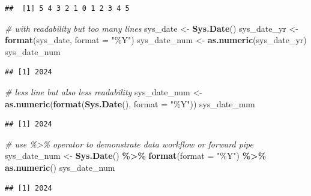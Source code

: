 \documentclass[
]{book}
\newenvironment{Shaded}{\begin{snugshade}}{\end{snugshade}}
\newcommand{\AttributeTok}[1]{\textcolor[rgb]{0.13,0.29,0.53}{#1}}
\newcommand{\CommentTok}[1]{\textcolor[rgb]{0.56,0.35,0.01}{\textit{#1}}}
\newcommand{\FunctionTok}[1]{\textcolor[rgb]{0.13,0.29,0.53}{\textbf{#1}}}
\newcommand{\NormalTok}[1]{#1}
\newcommand{\OtherTok}[1]{\textcolor[rgb]{0.56,0.35,0.01}{#1}}
\newcommand{\SpecialCharTok}[1]{\textcolor[rgb]{0.81,0.36,0.00}{\textbf{#1}}}
\newcommand{\StringTok}[1]{\textcolor[rgb]{0.31,0.60,0.02}{#1}}
\theoremstyle{definition}
\theoremstyle{definition}
\theoremstyle{definition}
\theoremstyle{definition}
\theoremstyle{remark}
\begin{document}
\begin{verbatim}
##  [1] 5 4 3 2 1 0 1 2 3 4 5
\end{verbatim}

\begin{Shaded}
\begin{Highlighting}[]
\CommentTok{\# with readability but too many lines}
\NormalTok{sys\_date }\OtherTok{\textless{}{-}} \FunctionTok{Sys.Date}\NormalTok{()}
\NormalTok{sys\_date\_yr }\OtherTok{\textless{}{-}} \FunctionTok{format}\NormalTok{(sys\_date, }\AttributeTok{format =} \StringTok{"\%Y"}\NormalTok{)}
\NormalTok{sys\_date\_num }\OtherTok{\textless{}{-}} \FunctionTok{as.numeric}\NormalTok{(sys\_date\_yr)}
\NormalTok{sys\_date\_num}
\end{Highlighting}
\end{Shaded}

\begin{verbatim}
## [1] 2024
\end{verbatim}

\begin{Shaded}
\begin{Highlighting}[]
\CommentTok{\# less line but also less readability}
\NormalTok{sys\_date\_num }\OtherTok{\textless{}{-}} \FunctionTok{as.numeric}\NormalTok{(}\FunctionTok{format}\NormalTok{(}\FunctionTok{Sys.Date}\NormalTok{(), }\AttributeTok{format =} \StringTok{"\%Y"}\NormalTok{))}
\NormalTok{sys\_date\_num}
\end{Highlighting}
\end{Shaded}

\begin{verbatim}
## [1] 2024
\end{verbatim}

\begin{Shaded}
\begin{Highlighting}[]
\CommentTok{\# use \%\textgreater{}\% operator to demonstrate data workflow or forward pipe}
\NormalTok{sys\_date\_num }\OtherTok{\textless{}{-}} \FunctionTok{Sys.Date}\NormalTok{() }\SpecialCharTok{\%\textgreater{}\%}
   \FunctionTok{format}\NormalTok{(}\AttributeTok{format =} \StringTok{"\%Y"}\NormalTok{) }\SpecialCharTok{\%\textgreater{}\%}
   \FunctionTok{as.numeric}\NormalTok{()}
\NormalTok{sys\_date\_num}
\end{Highlighting}
\end{Shaded}

\begin{verbatim}
## [1] 2024
\end{verbatim}
\end{document}

